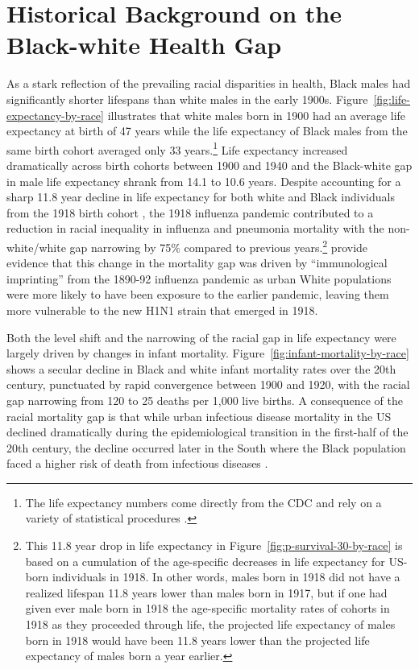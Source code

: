 \documentclass[12pt]{article}
\begin{document}

\section{Historical Background on the Black-white Health Gap\label{sec:background}}

As a stark reflection of the prevailing racial disparities in health, Black males had significantly shorter lifespans than white males in the early 1900s. 
Figure~\ref{fig:life-expectancy-by-race} illustrates that white males born in 1900 had an average life expectancy at birth of 47 years while the life expectancy of Black males from the same birth cohort averaged only 33 years.\footnote{
    The life expectancy numbers come directly from the CDC  and rely on a variety of statistical procedures . 
}
Life expectancy increased dramatically across birth cohorts between 1900 and 1940 and the Black-white gap in male life expectancy shrank from 14.1 to 10.6 years. 
Despite accounting for a sharp 11.8 year decline in life expectancy for both white and Black individuals from the 1918 birth cohort , the 1918 influenza pandemic contributed to a reduction in racial inequality in influenza and pneumonia mortality with the non-white/white gap narrowing by 75\% compared to previous years.\footnote{This 11.8 year drop in life expectancy in Figure~\ref{fig:p-survival-30-by-race} is based on a cumulation of the age-specific decreases in life expectancy for US-born individuals in 1918. 
In other words, males born in 1918 did not have a realized lifespan 11.8 years lower than males born in 1917, but if one had given ever male born in 1918 the age-specific mortality rates of cohorts in 1918 as they proceeded through life, the projected life expectancy of males born in 1918 would have been 11.8 years lower than the projected life expectancy of males born a year earlier.}
 provide evidence that this change in the mortality gap was driven by ``immunological imprinting'' from the 1890-92 influenza pandemic as urban White populations were more likely to have been exposure to the earlier pandemic, leaving them more vulnerable to the new H1N1 strain that emerged in 1918.

Both the level shift and the narrowing of the racial gap in life expectancy were largely driven by changes in infant mortality.
Figure~\ref{fig:infant-mortality-by-race} shows a secular decline in Black and white infant mortality rates over the 20th century, punctuated by rapid convergence between 1900 and 1920, with the  racial gap narrowing from 120 to 25 deaths per 1,000 live births.  
A consequence of the racial mortality gap is that while urban infectious disease mortality in the US declined dramatically during the epidemiological transition in the first-half of the 20th century, the decline occurred later in the South where the Black population faced a higher risk of death from infectious diseases . 
\end{document}
